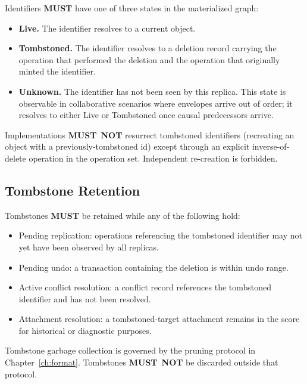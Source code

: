 \documentclass[11pt,letterpaper]{report}
\newcounter{requirement}[chapter]
\newcommand{\MUST}{\textbf{MUST}}
\newcommand{\MUSTNOT}{\textbf{MUST}\nobreak\ \textbf{NOT}}
\begin{document}
\begin{requirement}
  \label{req:semops:tombstone-state-machine}
  Identifiers \MUST{} have one of three states in the materialized
  graph:

  \begin{itemize}
    \item \textbf{Live.} The identifier resolves to a current object.
    \item \textbf{Tombstoned.} The identifier resolves to a deletion
      record carrying the operation that performed the deletion and
      the operation that originally minted the identifier.
    \item \textbf{Unknown.} The identifier has not been seen by this
      replica. This state is observable in collaborative scenarios
      where envelopes arrive out of order; it resolves to either Live
      or Tombstoned once causal predecessors arrive.
  \end{itemize}

  Implementations \MUSTNOT{} resurrect tombstoned identifiers
  (recreating an object with a previously-tombstoned id) except
  through an explicit inverse-of-delete operation in the operation
  set. Independent re-creation is forbidden.
\end{requirement}

\subsection{Tombstone Retention}

\begin{requirement}
  \label{req:semops:tombstone-retention}
  Tombstones \MUST{} be retained while any of the following hold:
  \begin{itemize}
    \item Pending replication: operations referencing the tombstoned
      identifier may not yet have been observed by all replicas.
    \item Pending undo: a transaction containing the deletion is
      within undo range.
    \item Active conflict resolution: a conflict record references
      the tombstoned identifier and has not been resolved.
    \item Attachment resolution: a tombstoned-target attachment
      remains in the score for historical or diagnostic purposes.
  \end{itemize}

  Tombstone garbage collection is governed by the pruning protocol
  in Chapter~\ref{ch:format}. Tombstones \MUSTNOT{} be discarded
  outside that protocol.
\end{requirement}
\end{document}
